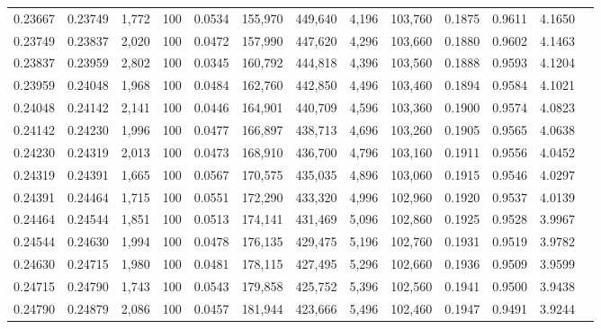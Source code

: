 \begin{tabular}{rrrrrrrrrrrrr}
0.23667 & 0.23749 &  1,772 & 100 &                                     0.0534 & 155,970 & 449,640 &   4,196 & 103,760 & 0.1875 & 0.9611 & 4.1650 \\
0.23749 & 0.23837 &  2,020 & 100 &                                     0.0472 & 157,990 & 447,620 &   4,296 & 103,660 & 0.1880 & 0.9602 & 4.1463 \\
0.23837 & 0.23959 &  2,802 & 100 &                                     0.0345 & 160,792 & 444,818 &   4,396 & 103,560 & 0.1888 & 0.9593 & 4.1204 \\
0.23959 & 0.24048 &  1,968 & 100 &                                     0.0484 & 162,760 & 442,850 &   4,496 & 103,460 & 0.1894 & 0.9584 & 4.1021 \\
0.24048 & 0.24142 &  2,141 & 100 &                                     0.0446 & 164,901 & 440,709 &   4,596 & 103,360 & 0.1900 & 0.9574 & 4.0823 \\
0.24142 & 0.24230 &  1,996 & 100 &                                     0.0477 & 166,897 & 438,713 &   4,696 & 103,260 & 0.1905 & 0.9565 & 4.0638 \\
0.24230 & 0.24319 &  2,013 & 100 &                                     0.0473 & 168,910 & 436,700 &   4,796 & 103,160 & 0.1911 & 0.9556 & 4.0452 \\
0.24319 & 0.24391 &  1,665 & 100 &                                     0.0567 & 170,575 & 435,035 &   4,896 & 103,060 & 0.1915 & 0.9546 & 4.0297 \\
0.24391 & 0.24464 &  1,715 & 100 &                                     0.0551 & 172,290 & 433,320 &   4,996 & 102,960 & 0.1920 & 0.9537 & 4.0139 \\
0.24464 & 0.24544 &  1,851 & 100 &                                     0.0513 & 174,141 & 431,469 &   5,096 & 102,860 & 0.1925 & 0.9528 & 3.9967 \\
0.24544 & 0.24630 &  1,994 & 100 &                                     0.0478 & 176,135 & 429,475 &   5,196 & 102,760 & 0.1931 & 0.9519 & 3.9782 \\
0.24630 & 0.24715 &  1,980 & 100 &                                     0.0481 & 178,115 & 427,495 &   5,296 & 102,660 & 0.1936 & 0.9509 & 3.9599 \\
0.24715 & 0.24790 &  1,743 & 100 &                                     0.0543 & 179,858 & 425,752 &   5,396 & 102,560 & 0.1941 & 0.9500 & 3.9438 \\
0.24790 & 0.24879 &  2,086 & 100 &                                     0.0457 & 181,944 & 423,666 &   5,496 & 102,460 & 0.1947 & 0.9491 & 3.9244 \\

\end{tabular}
